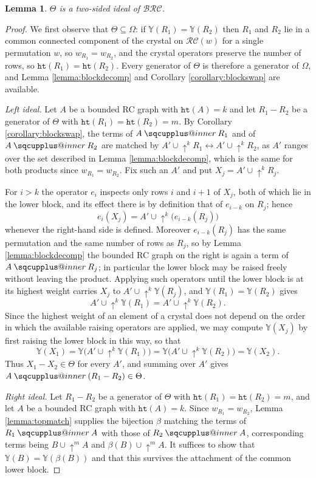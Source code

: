 \documentclass{amsart}
\makeatletter
\newcommand{\sqcupplus@inner}[2]{%
  \vcenter{\hbox{\ooalign{%
    \hfil$\m@th#1\sqcup$\hfil\cr
    \hfil\raisebox{0.15ex}{$\m@th#1\scriptscriptstyle+$}\hfil\cr
  }}}%
}
\newcommand{\sqcupplus}{\mathbin{\mathpalette\sqcupplus@inner\relax}}
\newtheorem{lemma}{Lemma}[subsection]
\theoremstyle{definition}
\theoremstyle{remark}
\numberwithin{equation}{subsection}
\newcommand{\shup}{{\uparrow}}
\newcommand{\wof}[1]{w_{#1}}
\newcommand{\hr}{\mathtt{ht}}
\newcommand{\BRC}{\mathcal{BRC}}
\newcommand{\RC}{\mathcal{RC}}
\makeatother
\begin{document}
\begin{lemma}
  $\Theta$ is a two-sided ideal of $\BRC$.
\end{lemma}
\begin{proof}
  We first observe that $\Theta\subseteq\Omega$: if $\mathbb{Y}(R_1)=\mathbb{Y}(R_2)$ then $R_1$ and $R_2$ lie in a common connected component of the crystal on $\RC(w)$ for a single permutation $w$, so $\wof{R_1}=\wof{R_2}$, and the crystal operators preserve the number of rows, so $\hr(R_1)=\hr(R_2)$. Every generator of $\Theta$ is therefore a generator of $\Omega$, and Lemma \ref{lemma:blockdecomp} and Corollary \ref{corollary:blockswap} are available.

  \emph{Left ideal.} Let $A$ be a bounded RC graph with $\hr(A)=k$ and let $R_1-R_2$ be a generator of $\Theta$ with $\hr(R_1)=\hr(R_2)=m$. By Corollary \ref{corollary:blockswap}, the terms of $A\sqcupplus R_1$ and of $A\sqcupplus R_2$ are matched by $A'\cup\shup^{k}R_1\leftrightarrow A'\cup\shup^{k}R_2$, as $A'$ ranges over the set described in Lemma \ref{lemma:blockdecomp}, which is the same for both products since $\wof{R_1}=\wof{R_2}$. Fix such an $A'$ and put $X_j=A'\cup\shup^{k}R_j$.

  For $i>k$ the operator $e_i$ inspects only rows $i$ and $i+1$ of $X_j$, both of which lie in the lower block, and its effect there is by definition that of $e_{i-k}$ on $R_j$; hence
  $$e_i(X_j)=A'\cup\shup^{k}\bigl(e_{i-k}(R_j)\bigr)$$
  whenever the right-hand side is defined. Moreover $e_{i-k}(R_j)$ has the same permutation and the same number of rows as $R_j$, so by Lemma \ref{lemma:blockdecomp} the bounded RC graph on the right is again a term of $A\sqcupplus R_j$; in particular the lower block may be raised freely without leaving the product. Applying such operators until the lower block is at its highest weight carries $X_j$ to $A'\cup\shup^{k}\mathbb{Y}(R_j)$, and $\mathbb{Y}(R_1)=\mathbb{Y}(R_2)$ gives
  $$A'\cup\shup^{k}\mathbb{Y}(R_1)=A'\cup\shup^{k}\mathbb{Y}(R_2).$$
  Since the highest weight of an element of a crystal does not depend on the order in which the available raising operators are applied, we may compute $\mathbb{Y}(X_j)$ by first raising the lower block in this way, so that
  $$\mathbb{Y}(X_1)=\mathbb{Y}\bigl(A'\cup\shup^{k}\mathbb{Y}(R_1)\bigr)=\mathbb{Y}\bigl(A'\cup\shup^{k}\mathbb{Y}(R_2)\bigr)=\mathbb{Y}(X_2).$$
  Thus $X_1-X_2\in\Theta$ for every $A'$, and summing over $A'$ gives $A\sqcupplus(R_1-R_2)\in\Theta$.

  \emph{Right ideal.} Let $R_1-R_2$ be a generator of $\Theta$ with $\hr(R_1)=\hr(R_2)=m$, and let $A$ be a bounded RC graph with $\hr(A)=k$. Since $\wof{R_1}=\wof{R_2}$, Lemma \ref{lemma:topmatch} supplies the bijection $\beta$ matching the terms of $R_1\sqcupplus A$ with those of $R_2\sqcupplus A$, corresponding terms being $B\cup\shup^{m}A$ and $\beta(B)\cup\shup^{m}A$. It suffices to show that $\mathbb{Y}(B)=\mathbb{Y}(\beta(B))$ and that this survives the attachment of the common lower block.


\end{proof}
\end{document}
